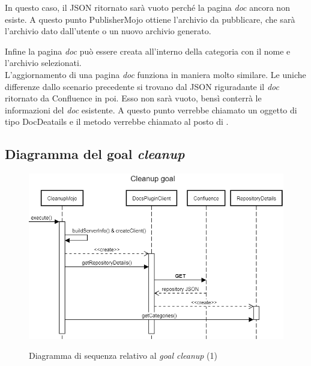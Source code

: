 In questo caso, il JSON ritornato sarà vuoto perché la pagina \emph{doc} ancora non esiste.
A questo punto PublisherMojo ottiene l'archivio da pubblicare, che sarà l'archivio dato dall'utente o un nuovo archivio generato.

Infine la pagina \emph{doc} può essere creata all'interno della categoria con il nome e l'archivio selezionati. \\


L'aggiornamento di una pagina \emph{doc} funziona in maniera molto similare.
Le uniche differenze dallo scenario precedente si trovano dal JSON riguradante il \emph{doc} ritornato da Confluence in poi.
Esso non sarà vuoto, bensì conterrà le informazioni del \emph{doc} esistente.
A questo punto verrebbe chiamato un oggetto di tipo DocDeatails e il metodo  verrebbe chiamato al posto di .


\subsection{Diagramma del goal \emph{cleanup}}


\begin{figure}[H]
    \centering
    \includegraphics[width=\textwidth]{immagini/CleanupSeq1.png}\\
    \caption{Diagramma di sequenza relativo al \emph{goal cleanup} (1)}
\end{figure}


